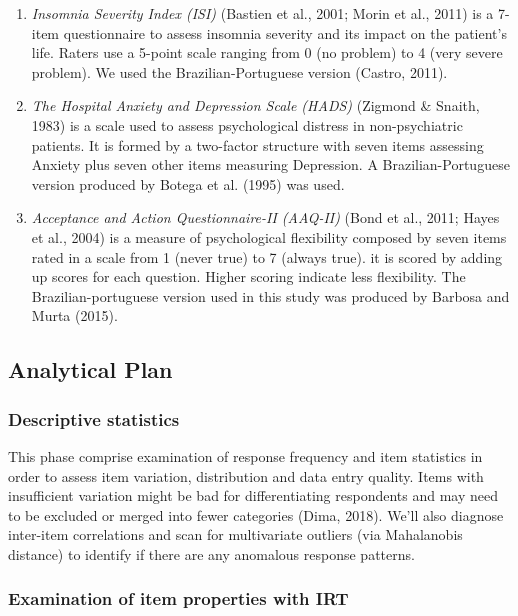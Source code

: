\documentclass[
  ,doc,11pt, twoside,floatsintext]{apa6}
\begin{document}
\begin{enumerate}
\def\labelenumi{\arabic{enumi}.}
\item
  \emph{Insomnia Severity Index (ISI)} (Bastien et al., 2001; Morin et al., 2011) is a 7-item questionnaire to assess insomnia severity and its impact on the patient's life. Raters use a 5-point scale ranging from 0 (no problem) to 4 (very severe problem). We used the Brazilian-Portuguese version (Castro, 2011).
\item
  \emph{The Hospital Anxiety and Depression Scale (HADS)} (Zigmond \& Snaith, 1983) is a scale used to assess psychological distress in non-psychiatric patients. It is formed by a two-factor structure with seven items assessing Anxiety plus seven other items measuring Depression. A Brazilian-Portuguese version produced by Botega et al. (1995) was used.
\item
  \emph{Acceptance and Action Questionnaire-II (AAQ-II)} (Bond et al., 2011; Hayes et al., 2004) is a measure of psychological flexibility composed by seven items rated in a scale from 1 (never true) to 7 (always true). it is scored by adding up scores for each question. Higher scoring indicate less flexibility. The Brazilian-portuguese version used in this study was produced by Barbosa and Murta (2015).
\end{enumerate}

\hypertarget{analytical-plan}{%
\subsection{Analytical Plan}\label{analytical-plan}}

\hypertarget{descriptive-statistics}{%
\subsubsection{Descriptive statistics}\label{descriptive-statistics}}

This phase comprise examination of response frequency and item statistics in order to assess item variation, distribution and data entry quality. Items with insufficient variation might be bad for differentiating respondents and may need to be excluded or merged into fewer categories (Dima, 2018). We'll also diagnose inter-item correlations and scan for multivariate outliers (via Mahalanobis distance) to identify if there are any anomalous response patterns.

\hypertarget{examination-of-item-properties-with-irt}{%
\subsubsection{Examination of item properties with IRT}\label{examination-of-item-properties-with-irt}}
\end{document}
